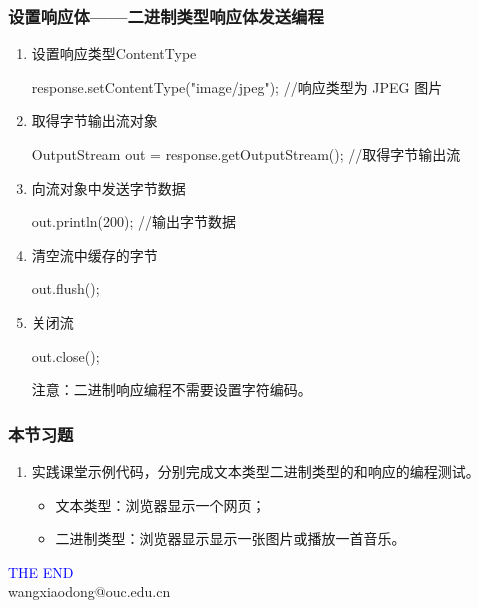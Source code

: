 \begin{frame}[fragile] %
\frametitle{设置响应体——二进制类型响应体发送编程}
\begin{enumerate}
\item 设置响应类型ContentType
\begin{javaCode}
response.setContentType("image/jpeg"); //响应类型为 JPEG 图片
\end{javaCode}

\item 取得字节输出流对象
\begin{javaCode}
OutputStream out = response.getOutputStream(); //取得字节输出流
\end{javaCode}

\item 向流对象中发送字节数据
\begin{javaCode}
out.println(200); //输出字节数据
\end{javaCode}

\item 清空流中缓存的字节
\begin{javaCode}
out.flush();
\end{javaCode}

\item 关闭流
\begin{javaCode}
out.close();
\end{javaCode}

{\Red\kai 注意：二进制响应编程不需要设置字符编码。}
\end{enumerate}
\end{frame}
\begin{frame}
  \frametitle{本节习题}

  \begin{enumerate}
  \item 实践课堂示例代码，分别完成文本类型二进制类型的和响应的编程测试。
    \begin{itemize}
    \item 文本类型：浏览器显示一个网页；
    \item 二进制类型：浏览器显示显示一张图片或播放一首音乐。      
    \end{itemize}
  \end{enumerate}
\end{frame}
\begin{frame}
\centering
{\Huge \textcolor{blue}{THE END}} \\
\vspace{5mm}
{\Large wangxiaodong@ouc.edu.cn} \\
\end{frame}


